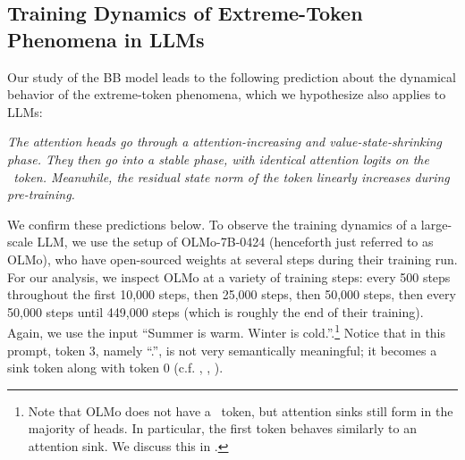 \begin{figure}
{    %
    }
    \label{fig:dormant_heads_domain_dependent}
\end{figure}


\subsection{Training Dynamics of Extreme-Token Phenomena in LLMs}\label{sub:olmo_dynamics}


Our study of the BB model leads to the following prediction about the dynamical behavior of the extreme-token phenomena, which we hypothesize also applies to LLMs:  
\begin{center}
    \textit{The attention heads go through a attention-increasing and value-state-shrinking phase. They then go into a stable phase, with identical attention logits on the \bos~token. Meanwhile, the residual state norm of the \bos{} token linearly increases during pre-training.}
\end{center}

We confirm these predictions below. To observe the training dynamics of a large-scale LLM, we use the setup of OLMo-7B-0424 \citep{groeneveld2024olmo} (henceforth just referred to as OLMo), who have open-sourced weights at several steps during their training run. For our analysis, we inspect OLMo at a variety of training steps: every 500 steps throughout the first 10,000 steps, then 25,000 steps, then 50,000 steps, then every 50,000 steps until 449,000 steps (which is roughly the end of their training). Again, we use the input ``Summer is warm. Winter is cold.''.\footnote{Note that OLMo does not have a \bos{}~token, but attention sinks still form in the majority of heads. In particular, the first token behaves similarly to an attention sink. We discuss this in .} Notice that in this prompt, token \(3\), namely ``.'', is not very semantically meaningful; it becomes a sink token along with token \(0\) (c.f. , , ).

